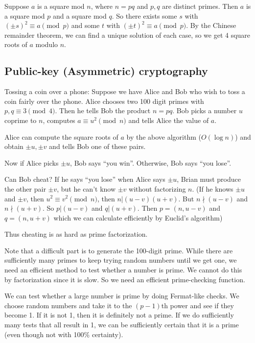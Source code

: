 \documentclass[a4paper]{article}
\begin{document}
  Suppose $a$ is a square mod $n$, where $n = pq$ and $p, q$ are distinct primes. Then $a$ is a square mod $p$ and a square mod $q$. So there exists some $s$ with $(\pm s)^2 \equiv a\pmod p$ and some $t$ with $(\pm t)^2\equiv a\pmod p$. By the Chinese remainder theorem, we can find a unique solution of each case, so we get 4 square roots of $a$ modulo $n$.

  \subsection{Public-key (Asymmetric) cryptography}
  Tossing a coin over a phone: Suppose we have Alice and Bob who wish to toss a coin fairly over the phone. Alice chooses two 100 digit primes with $p, q\equiv 3\pmod 4$. Then he tells Bob the product $n = pq$. Bob picks a number $u$ coprime to $n$, computes $a\equiv u^2\pmod n$ and tells Alice the value of $a$.

  Alice can compute the square roots of $a$ by the above algorithm ($O(\log n)$) and obtain $\pm u, \pm v$ and tells Bob one of these pairs.

  Now if Alice picks $\pm u$, Bob says ``you win''. Otherwise, Bob says ``you lose''.

  Can Bob cheat? If he says ``you lose'' when Alice says $\pm u$, Brian must produce the other pair $\pm v$, but he can't know $\pm v$ without factorizing $n$. (If he knows $\pm u$ and $\pm v$, then $u^2 \equiv v^2\pmod n$, then $n | (u - v)(u + v)$. But $n\nmid (u - v)$ and $n\nmid (u + v)$. So $p | (u - v)$ and $q | (u + v)$. Then $p = (n, u - v)$ and $q = (n, u + v)$ which we can calculate efficiently by Euclid's algorithm)

  Thus cheating is as hard as prime factorization.

  Note that a difficult part is to generate the 100-digit prime. While there are sufficiently many primes to keep trying random numbers until we get one, we need an efficient method to test whether a number is prime. We cannot do this by factorization since it is slow. So we need an efficient prime-checking function.

  We can test whether a large number is prime by doing Fermat-like checks. We choose random numbers and take it to the $(p - 1)$th power and see if they become 1. If it is not 1, then it is definitely not a prime. If we do sufficiently many tests that all result in 1, we can be sufficiently certain that it is a prime (even though not with 100\% certainty).
\end{document}
